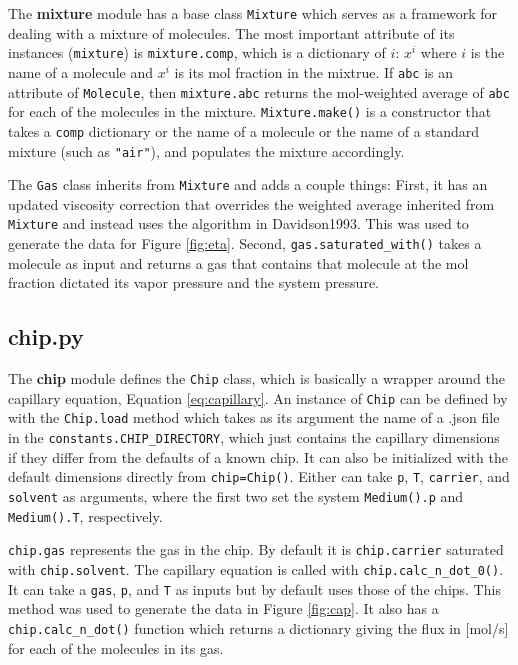 \documentclass{article}
\newcommand{\code}[1]{\colorbox{codegray}{\lstinline{#1}}}
\begin{document}
The \textbf{mixture} module has a base class \code{Mixture} which serves as a framework for dealing with a mixture of molecules. The most important attribute of its instances (\code{mixture}) is \code{mixture.comp}, which is a dictionary of {$i$: $x^i$} where $i$ is the name of a molecule and $x^i$ is its mol fraction in the mixtrue. If \code{abc} is an attribute of \code{Molecule}, then \code{mixture.abc} returns the mol-weighted average of \code{abc} for each of the molecules in the mixture. \code{Mixture.make()} is a constructor that takes a \code{comp} dictionary or the name of a molecule or the name of a standard mixture (such as \code{"air"}), and populates the mixture accordingly.

The \code{Gas} class inherits from \code{Mixture} and adds a couple things: First, it has an updated viscosity correction that overrides the weighted average inherited from \code{Mixture} and instead uses the algorithm in Davidson1993. This was used to generate the data for Figure \ref{fig:eta}. Second, \code{gas.saturated_with()} takes a molecule as input and returns a gas that contains that molecule at the mol fraction dictated its vapor pressure and the system pressure.

\subsection{chip.py}\label{sec:chip} 

The \textbf{chip} module defines the \code{Chip} class, which is basically a wrapper around the capillary equation, Equation \ref{eq:capillary}. An instance of \code{Chip} can be defined by with the \code{Chip.load} method which takes as its argument the name of a .json file in the \code{constants.CHIP_DIRECTORY}, which just contains the capillary dimensions if they differ from the defaults of a known chip. It can also be initialized with the default dimensions directly from \code{chip=Chip()}. Either can take \code{p}, \code{T}, \code{carrier}, and \code{solvent} as arguments, where the first two set the system \code{Medium().p} and \code{Medium().T}, respectively. 

\code{chip.gas} represents the gas in the chip. By default it is \code{chip.carrier} saturated with \code{chip.solvent}. The capillary equation is called with \code{chip.calc_n_dot_0()}. It can take a \code{gas}, \code{p}, and \code{T} as inputs but by default uses those of the chips. This method was used to generate the data in Figure \ref{fig:cap}. It also has a \code{chip.calc_n_dot()} function which returns a dictionary giving the flux in [mol/s] for each of the molecules in its gas.
\end{document}
